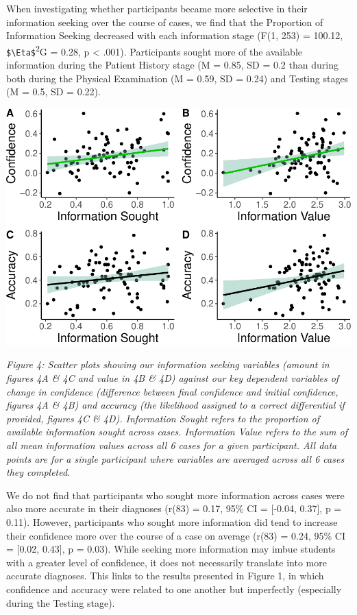 \documentclass[a4paper, nobind]{templates/ociamthesis}
\begin{document}
When investigating whether participants became more selective in their information seeking over the course of cases, we find that the Proportion of Information Seeking decreased with each information stage (F(1, 253) = 100.12, \texttt{\$\textbackslash{}Eta\$}\textsuperscript{2}G = 0.28, p \textless{} .001). Participants sought more of the available information during the Patient History stage (M = 0.85, SD = 0.2 than during both during the Physical Examination (M = 0.59, SD = 0.24) and Testing stages (M = 0.5, SD = 0.22).

\begin{center}\includegraphics[width=1\linewidth]{_main_files/figure-latex/confAccPlot-1} \end{center}

\emph{Figure 4: Scatter plots showing our information seeking variables (amount in figures 4A \& 4C and value in 4B \& 4D) against our key dependent variables of change in confidence (difference between final confidence and initial confidence, figures 4A \& 4B) and accuracy (the likelihood assigned to a correct differential if provided, figures 4C \& 4D). Information Sought refers to the proportion of available information sought across cases. Information Value refers to the sum of all mean information values across all 6 cases for a given participant. All data points are for a single participant where variables are averaged across all 6 cases they completed.}

We do not find that participants who sought more information across cases were also more accurate in their diagnoses (r(83) = 0.17, 95\% CI = {[}-0.04, 0.37{]}, p = 0.11). However, participants who sought more information did tend to increase their confidence more over the course of a case on average (r(83) = 0.24, 95\% CI = {[}0.02, 0.43{]}, p = 0.03). While seeking more information may imbue students with a greater level of confidence, it does not necessarily translate into more accurate diagnoses. This links to the results presented in Figure 1, in which confidence and accuracy were related to one another but imperfectly (especially during the Testing stage).
\end{document}
